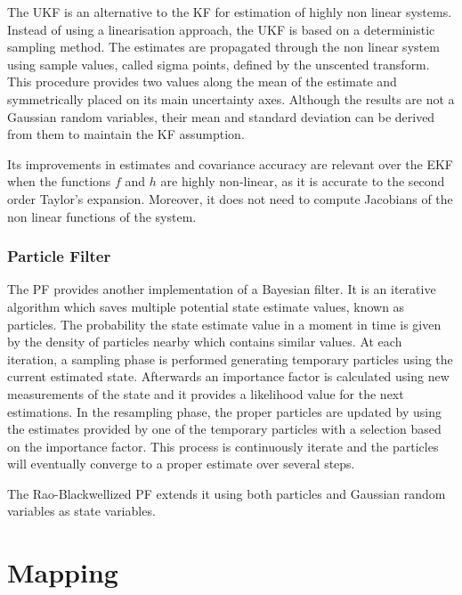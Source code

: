 \noindent The \gls{UKF} is an alternative to the \gls{KF} for estimation of highly non linear systems\cite{unscentedK}.
Instead of using a linearisation approach, the \gls{UKF} is based on a deterministic sampling method. 
The estimates are propagated through the non linear system using sample values, called sigma points, defined by the unscented transform.
This procedure provides two values along the mean of the estimate and symmetrically placed on its main uncertainty axes.
Although the results are not a Gaussian random variables, their mean and standard deviation can be derived from them to maintain the \gls{KF} assumption.

Its improvements in estimates and covariance accuracy are relevant over the \gls{EKF} when the functions $f$ and $h$ are highly non-linear, as it is accurate to the second order Taylor's expansion. 
Moreover, it does not need to compute Jacobians of the non linear functions of the system\cite{thrun_probabilistic_2005}.



\subsubsection{Particle Filter}

\noindent The \gls{PF} provides another implementation of a Bayesian filter\cite{particle}.
It is an iterative algorithm which saves multiple potential state estimate values, known as particles.
The probability the state estimate value in a moment in time is given by the density of particles nearby which contains similar values.
At each iteration, a sampling phase is performed generating temporary particles using the current estimated state.
Afterwards an importance factor is calculated using new measurements of the state and it provides a likelihood value for the next estimations.
In the resampling phase, the proper particles are updated by using the estimates provided by one of the temporary particles with a selection based on the importance factor.
This process is continuously iterate and the particles will eventually converge to a proper estimate over several steps.
    
The Rao-Blackwellized \gls{PF} extends it using both particles and Gaussian random variables as state variables\cite{murphy_rao-blackwellised_2001}.

\section{Mapping}


